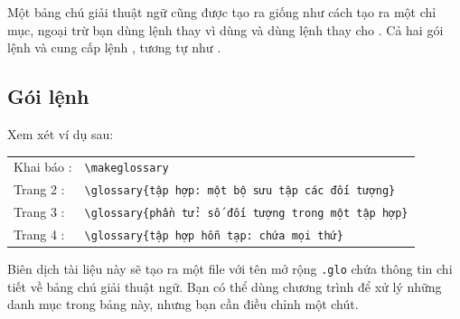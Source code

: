 \documentclass[a4paper]{report}
\begin{document}
\noindent Một bảng chú giải thuật ngữ cũng được tạo ra giống như cách tạo ra một chỉ mục, ngoại trừ bạn dùng lệnh  thay vì dùng  và dùng lệnh  thay cho . Cả hai gói lệnh  và  cung cấp lệnh , tương tự như .


\subsection{Gói lệnh }

Xem xét ví dụ sau:
\begin{center}
\begin{tabular}{ll}
Khai báo : & \verb|\makeglossary|\\
Trang 2 : & \verb"\glossary{tập hợp: một bộ sưu tập các đối tượng}"\\
Trang 3 : & \verb"\glossary{phần tử: số đối tượng trong một tập hợp}"\\
Trang 4 : & \verb"\glossary{tập hợp hỗn tạp: chứa mọi thứ}"
\end{tabular}
\end{center}
\noindent Biên dịch tài liệu này sẽ tạo ra một file với tên mở rộng \texttt{.glo} chứa thông tin chi tiết về bảng chú giải thuật ngữ. Bạn có thể dùng chương trình  để xử lý những danh mục trong bảng này, nhưng bạn cần điều chỉnh một chút.
\end{document}
